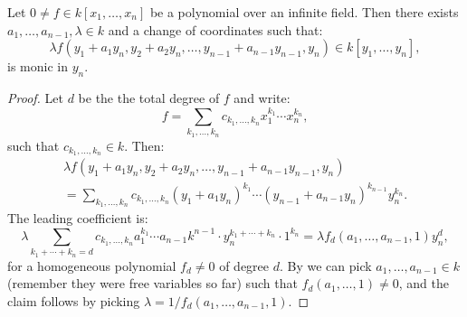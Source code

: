 \documentclass[11pt,a4paper]{article}
\begin{document}
\begin{lemma}
  \label{lem:nother-lem-lem}
  Let $0 \neq f \in k[x_1,\dots,x_n]$ be a polynomial
  over an infinite field.
  Then there exists $a_1,\dots,a_{n-1},\lambda \in k$
  and a change of coordinates
  such that:
  \[
    \lambda f(y_1 + a_1 y_n, y_2 + a_2 y_n, \dots, y_{n-1} + a_{n-1} y_{n-1},y_n) \in k[y_1,\dots,y_n],
  \]
  is monic in $y_n$.
\end{lemma}
\begin{proof}
  Let $d$ be the the total degree of $f$ and write:
  \[
    f = \sum_{k_1,\dots,k_n} c_{k_1,\dots,k_n} x_1^{k_1} \cdots x_n^{k_n},
  \]
  such that $c_{k_1,\dots,k_n} \in k$.
  Then:
  \begin{multline*}
    \lambda f(y_1 + a_1 y_n, y_2 + a_2 y_n,
      \dots, y_{n-1} + a_{n-1} y_{n-1},y_n) \\
    = \sum_{k_1,\dots,k_n} c_{k_1,\dots,k_n}
      (y_1 + a_1 y_n)^{k_1} \cdots
      (y_{n-1} + a_{n-1} y_n)^{k_{n-1}} y_n^{k_n}.
  \end{multline*}
  The leading coefficient is:
  \[
    \lambda \sum_{k_1 + \cdots + k_n = d}
    c_{k_1,\dots,k_n} a_1^{k_1} \cdots a_{n-1} k^{n-1} \cdot y_n^{k_1 + \cdots + k_n} \cdot 1^{k_n}
    = \lambda f_d(a_1,\dots,a_{n-1},1) y_n^d,
  \]
  for a homogeneous polynomial $f_d \neq 0$ of degree $d$.
  By  we can pick $a_1,\dots,a_{n-1} \in k$
  (remember they were free variables so far)
  such that $f_d(a_1,\dots,1) \neq 0$,
  and the claim follows by picking $\lambda = 1/f_d(a_1,\dots,a_{n-1},1)$.
\end{proof}
\end{document}
